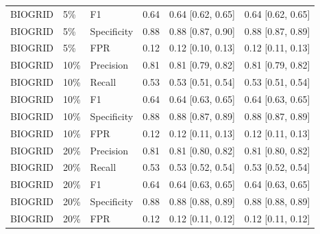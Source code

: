 \begin{longtable}{@{}lllrp{}p{}@{}}
BIOGRID & 5\% & F1 & 0.64 & 0.64 [0.62, 0.65] & 0.64 [0.62, 0.65] \\
BIOGRID & 5\% & Specificity & 0.88 & 0.88 [0.87, 0.90] & 0.88 [0.87, 0.89] \\
BIOGRID & 5\% & FPR & 0.12 & 0.12 [0.10, 0.13] & 0.12 [0.11, 0.13] \\
BIOGRID & 10\% & Precision & 0.81 & 0.81 [0.79, 0.82] & 0.81 [0.79, 0.82] \\
BIOGRID & 10\% & Recall & 0.53 & 0.53 [0.51, 0.54] & 0.53 [0.51, 0.54] \\
BIOGRID & 10\% & F1 & 0.64 & 0.64 [0.63, 0.65] & 0.64 [0.63, 0.65] \\
BIOGRID & 10\% & Specificity & 0.88 & 0.88 [0.87, 0.89] & 0.88 [0.87, 0.89] \\
BIOGRID & 10\% & FPR & 0.12 & 0.12 [0.11, 0.13] & 0.12 [0.11, 0.13] \\
BIOGRID & 20\% & Precision & 0.81 & 0.81 [0.80, 0.82] & 0.81 [0.80, 0.82] \\
BIOGRID & 20\% & Recall & 0.53 & 0.53 [0.52, 0.54] & 0.53 [0.52, 0.54] \\
BIOGRID & 20\% & F1 & 0.64 & 0.64 [0.63, 0.65] & 0.64 [0.63, 0.65] \\
BIOGRID & 20\% & Specificity & 0.88 & 0.88 [0.88, 0.89] & 0.88 [0.88, 0.89] \\
BIOGRID & 20\% & FPR & 0.12 & 0.12 [0.11, 0.12] & 0.12 [0.11, 0.12] \\
\end{longtable}
\endgroup
